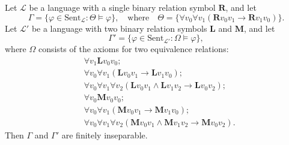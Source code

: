 Let $\mathcal{L}$ be a language with a single binary relation symbol $\mathbf{R}$, and let
$$
\Gamma = \{\varphi \in \text{Sent}_{\mathcal{L}} : \Theta \models \varphi\},
\quad\text{where}\quad
\Theta = \{\forall v_0 \forall v_1 (\mathbf{R}v_0v_1 \rightarrow \mathbf{R}v_1v_0)\}.
$$
Let $\mathcal{L}'$ be a language with two binary relation symbols $\mathbf{L}$ and $\mathbf{M}$, and let
$$
\Gamma' = \{\varphi \in \text{Sent}_{\mathcal{L}'} : \Omega \models \varphi\},
$$
where $\Omega$ consists of the axioms for two equivalence relations:
$$
\begin{aligned}
&\forall v_1 \mathbf{L}v_0v_0; \\
&\forall v_0 \forall v_1 (\mathbf{L}v_0v_1 \rightarrow \mathbf{L}v_1v_0); \\
&\forall v_0 \forall v_1 \forall v_2 (\mathbf{L}v_0v_1 \wedge \mathbf{L}v_1v_2 \rightarrow \mathbf{L}v_0v_2); \\
&\forall v_0 \mathbf{M}v_0v_0; \\
&\forall v_0 \forall v_1 (\mathbf{M}v_0v_1 \rightarrow \mathbf{M}v_1v_0); \\
&\forall v_0 \forall v_1 \forall v_2 (\mathbf{M}v_0v_1 \wedge \mathbf{M}v_1v_2 \rightarrow \mathbf{M}v_0v_2).
\end{aligned}
$$
Then $\Gamma$ and $\Gamma'$ are finitely inseparable.
